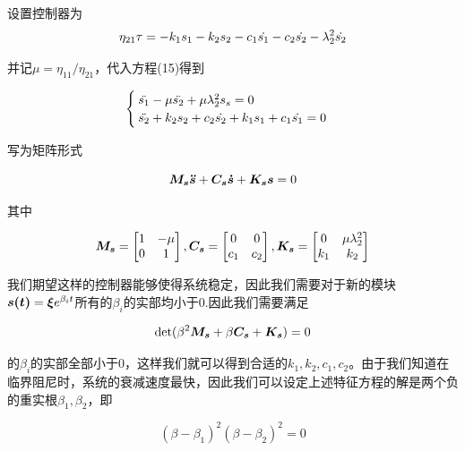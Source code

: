 \documentclass[UTF8]{ctexart}
\begin{document}
设置控制器为
\begin{equation}
    \eta_{21}\tau = -k_1 s_1 - k_2 s_2 - c_1 \dot{s_1} - c_2 \dot{s_2} -\lambda_2^2\dot{s_2}
\end{equation}

并记$\mu = \eta_{11}/\eta_{21}$，代入方程(15)得到

\begin{equation}
    \begin{cases}
        \ddot{s_1}-\mu\ddot{s_2}+\mu\lambda_2^2 s_s = 0\\
        \ddot{s_2}+k_2 s_2+c_2 \dot{s_2}+k_1 s_1+c_1 \dot{s_1}=0
    \end{cases}
\end{equation}

写为矩阵形式

\begin{equation}
    \boldsymbol{M_s} \boldsymbol{\ddot{s}}+\boldsymbol{C_s}\boldsymbol{\dot{s}}+\boldsymbol{K_s} \boldsymbol{s} = 0
\end{equation}

其中

\begin{equation}
    \boldsymbol{M_s} = \begin{bmatrix}
        1 & -\mu\\
        0 & 1
    \end{bmatrix},
    \boldsymbol{C_s} = \begin{bmatrix}
        0 & 0\\
        c_1 & c_2
    \end{bmatrix},
    \boldsymbol{K_s} = \begin{bmatrix}
        0 & \mu\lambda_2^2\\
        k_1 & k_2
    \end{bmatrix}
\end{equation}

我们期望这样的控制器能够使得系统稳定，因此我们需要对于新的模块$\boldsymbol{s(t)}=\boldsymbol{\xi}e^{\beta_i t}$所有的$\beta_i$的实部均小于0.因此我们需要满足

\begin{equation}
    \det(\beta^2\boldsymbol{M_s}+\beta\boldsymbol{C_s}+\boldsymbol{K_s}) = 0
\end{equation}

的$\beta_i$的实部全部小于0，这样我们就可以得到合适的$k_1,k_2,c_1,c_2$。由于我们知道在临界阻尼时，系统的衰减速度最快，因此我们可以设定上述特征方程的解是两个负的重实根$\beta_1,\beta_2$，即

\begin{equation}
    (\beta - \beta_1)^2(\beta-\beta_2)^2=0
\end{equation}
\end{document}
